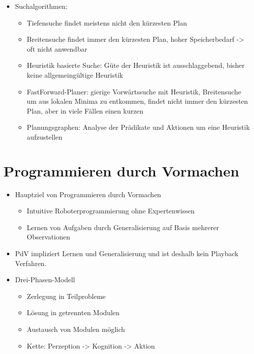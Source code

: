 \documentclass[paper=a4, fontsize=11pt]{scrartcl} %
\numberwithin{equation}{section} %
\numberwithin{figure}{section} %
\numberwithin{table}{section} %
\begin{document}
\begin{itemize}
\begin{itemize}
\item Suchalgorithmen:
\begin{itemize}
\item Tiefensuche findet meistens nicht den kürzesten Plan
\item Breitensuche findet immer den kürzesten Plan, hoher Speicherbedarf -> oft nicht anwendbar
\item Heuristik basierte Suche: Güte der Heuristik ist ausschlaggebend, bisher keine allgemeingültige Heuristik
\item FastForward-Planer: gierige Vorwärtssuche mit Heuristik, Breitensuche um aus lokalen Minima zu entkommen, findet nicht immer den kürzesten Plan, aber in viele Fällen einen kurzen
\item Planungsgraphen: Analyse der Prädikate und Aktionen um eine Heuristik aufzustellen
\end{itemize}
\end{itemize}
\end{itemize}

\section{Programmieren durch Vormachen}

\begin{itemize}
\item Hauptziel von Programmieren durch Vormachen
\begin{itemize}
\item Intuitive Roboterprogrammierung ohne Expertenwissen
\item Lernen von Aufgaben durch Generalisierung auf Basis mehrerer Observationen
\end{itemize}
\item PdV impliziert Lernen und Generalisierung und ist deshalb kein Playback Verfahren.
\item Drei-Phasen-Modell
\begin{itemize}
\item Zerlegung in Teilprobleme
\item Lösung in getrennten Modulen
\item Austausch von Modulen möglich
\item Kette: Perzeption -> Kognition -> Aktion
\end{itemize}
\end{itemize}
\end{document}
